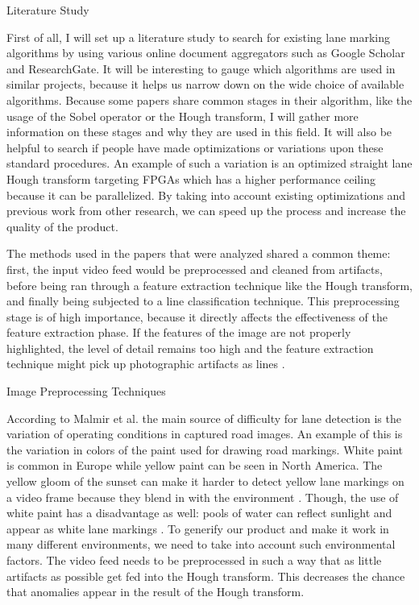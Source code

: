 \documentclass{matthijs}
\begin{document}
	\begin{hoofdstuk}{Literature Study}

		First of all, I will set up a literature study to search for existing lane marking algorithms by using various online document aggregators such as Google Scholar and ResearchGate.
		It will be interesting to gauge which algorithms are used in similar projects, because it helps us narrow down on the wide choice of available algorithms.
		Because some papers share common stages in their algorithm, like the usage of the Sobel operator or the Hough transform, I will gather more information on these stages and why they are used in this field.
		It will also be helpful to search if people have made optimizations or variations upon these standard procedures.
		An example of such a variation is an optimized straight lane Hough transform targeting FPGAs \cite{el2020novel} which has a higher performance ceiling because it can be parallelized.
		By taking into account existing optimizations and previous work from other research, we can speed up the process and increase the quality of the product.

		\bigskip

		The methods used in the papers that were analyzed shared a common theme: first, the input video feed would be preprocessed and cleaned from artifacts, before being ran through a feature extraction technique like the Hough transform, and finally being subjected to a line classification technique.
		This preprocessing stage is of high importance, because it directly affects the effectiveness of the feature extraction phase.
		If the features of the image are not properly highlighted, the level of detail remains too high and the feature extraction technique might pick up photographic artifacts as lines \cite{felix2003low}.

		\begin{paragraaf}{Image Preprocessing Techniques}

			According to Malmir et al. \cite{malmir2019design} the main source of difficulty for lane detection is the variation of operating conditions in captured road images.
			An example of this is the variation in colors of the paint used for drawing road markings.
			White paint is common in Europe while yellow paint can be seen in North America.
			The yellow gloom of the sunset can make it harder to detect yellow lane markings on a video frame because they blend in with the environment \cite{tumasov2021research}.
			Though, the use of white paint has a disadvantage as well: pools of water can reflect sunlight and appear as white lane markings \cite{krine2021road}.
			To generify our product and make it work in many different environments, we need to take into account such environmental factors.
			The video feed needs to be preprocessed in such a way that as little artifacts as possible get fed into the Hough transform.
			This decreases the chance that anomalies appear in the result of the Hough transform.
			

\end{paragraaf}
\end{hoofdstuk}
\end{document}
